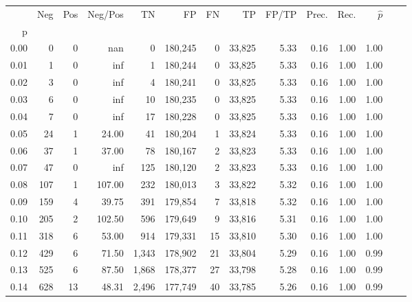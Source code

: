\begin{tabular}{rrrrrrrrrrrrrr}
\toprule
{} &    Neg &  Pos & Neg/Pos &       TN &       FP &      FN &      TP & FP/TP & Prec. &  Rec. & $\hat{p}$ \\
p    &        &      &         &          &          &         &         &       &       &       &           \\
\midrule
0.00 &      0 &    0 &     nan &        0 &  180,245 &       0 &  33,825 &  5.33 &  0.16 &  1.00 &      1.00 \\
0.01 &      1 &    0 &     inf &        1 &  180,244 &       0 &  33,825 &  5.33 &  0.16 &  1.00 &      1.00 \\
0.02 &      3 &    0 &     inf &        4 &  180,241 &       0 &  33,825 &  5.33 &  0.16 &  1.00 &      1.00 \\
0.03 &      6 &    0 &     inf &       10 &  180,235 &       0 &  33,825 &  5.33 &  0.16 &  1.00 &      1.00 \\
0.04 &      7 &    0 &     inf &       17 &  180,228 &       0 &  33,825 &  5.33 &  0.16 &  1.00 &      1.00 \\
0.05 &     24 &    1 &   24.00 &       41 &  180,204 &       1 &  33,824 &  5.33 &  0.16 &  1.00 &      1.00 \\
0.06 &     37 &    1 &   37.00 &       78 &  180,167 &       2 &  33,823 &  5.33 &  0.16 &  1.00 &      1.00 \\
0.07 &     47 &    0 &     inf &      125 &  180,120 &       2 &  33,823 &  5.33 &  0.16 &  1.00 &      1.00 \\
0.08 &    107 &    1 &  107.00 &      232 &  180,013 &       3 &  33,822 &  5.32 &  0.16 &  1.00 &      1.00 \\
0.09 &    159 &    4 &   39.75 &      391 &  179,854 &       7 &  33,818 &  5.32 &  0.16 &  1.00 &      1.00 \\
0.10 &    205 &    2 &  102.50 &      596 &  179,649 &       9 &  33,816 &  5.31 &  0.16 &  1.00 &      1.00 \\
0.11 &    318 &    6 &   53.00 &      914 &  179,331 &      15 &  33,810 &  5.30 &  0.16 &  1.00 &      1.00 \\
0.12 &    429 &    6 &   71.50 &    1,343 &  178,902 &      21 &  33,804 &  5.29 &  0.16 &  1.00 &      0.99 \\
0.13 &    525 &    6 &   87.50 &    1,868 &  178,377 &      27 &  33,798 &  5.28 &  0.16 &  1.00 &      0.99 \\
0.14 &    628 &   13 &   48.31 &    2,496 &  177,749 &      40 &  33,785 &  5.26 &  0.16 &  1.00 &      0.99 \\

\end{tabular}
